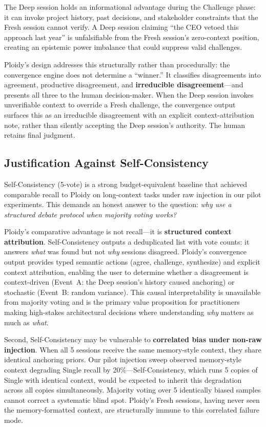 \documentclass[11pt]{article}
\begin{document}
The Deep session holds an informational advantage during the Challenge phase: it can invoke project history, past decisions, and stakeholder constraints that the Fresh session cannot verify. A Deep session claiming ``the CEO vetoed this approach last year'' is unfalsifiable from the Fresh session's zero-context position, creating an epistemic power imbalance that could suppress valid challenges.

Ploidy's design addresses this structurally rather than procedurally: the convergence engine does not determine a ``winner.'' It classifies disagreements into agreement, productive disagreement, and \textbf{irreducible disagreement}---and presents all three to the human decision-maker. When the Deep session invokes unverifiable context to override a Fresh challenge, the convergence output surfaces this as an irreducible disagreement with an explicit context-attribution note, rather than silently accepting the Deep session's authority. The human retains final judgment.

\subsection{Justification Against Self-Consistency}
\label{sec:vs-self-consistency}

Self-Consistency (5-vote) is a strong budget-equivalent baseline that achieved comparable recall to Ploidy on long-context tasks under raw injection in our pilot experiments. This demands an honest answer to the question: \emph{why use a structured debate protocol when majority voting works?}

Ploidy's comparative advantage is not recall---it is \textbf{structured context attribution}. Self-Consistency outputs a deduplicated list with vote counts: it answers \emph{what} was found but not \emph{why} sessions disagreed. Ploidy's convergence output provides typed semantic actions (agree, challenge, synthesize) and explicit context attribution, enabling the user to determine whether a disagreement is context-driven (Event~A: the Deep session's history caused anchoring) or stochastic (Event~B: random variance). This causal interpretability is unavailable from majority voting and is the primary value proposition for practitioners making high-stakes architectural decisions where understanding \emph{why} matters as much as \emph{what}.

Second, Self-Consistency may be vulnerable to \textbf{correlated bias under non-raw injection}. When all 5 sessions receive the same memory-style context, they share identical anchoring priors. Our pilot injection sweep observed memory-style context degrading Single recall by 20\%---Self-Consistency, which runs 5 copies of Single with identical context, would be expected to inherit this degradation across all copies simultaneously. Majority voting over 5 identically biased samples cannot correct a systematic blind spot. Ploidy's Fresh sessions, having never seen the memory-formatted context, are structurally immune to this correlated failure mode.
\end{document}
